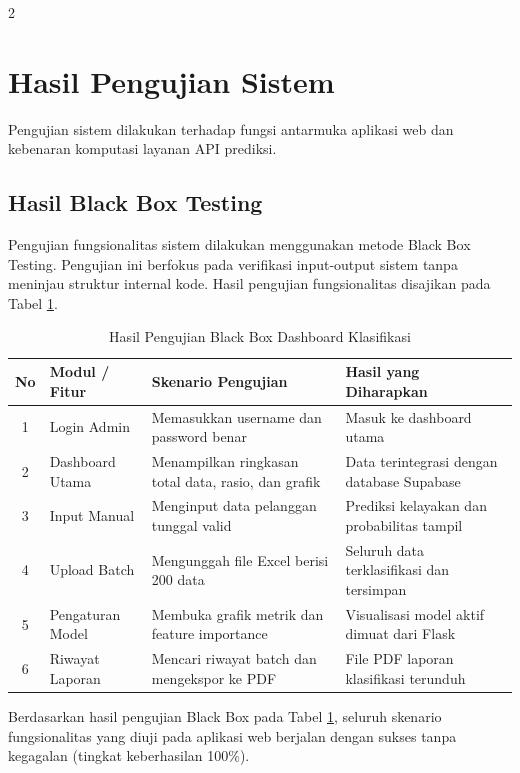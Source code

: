 \documentclass[12pt, a4paper, onecolumn, oneside]{report}
\begin{document}
\begin{spacing}{2}
\section{Hasil Pengujian Sistem}
Pengujian sistem dilakukan terhadap fungsi antarmuka aplikasi web dan kebenaran komputasi layanan API prediksi.

\subsection{Hasil Black Box Testing}
Pengujian fungsionalitas sistem dilakukan menggunakan metode Black Box Testing. Pengujian ini berfokus pada verifikasi input-output sistem tanpa meninjau struktur internal kode. Hasil pengujian fungsionalitas disajikan pada Tabel \ref{tab:blackbox_testing_results}.

\begin{table}[H]
\centering
\caption{Hasil Pengujian Black Box Dashboard Klasifikasi}
\label{tab:blackbox_testing_results}
\begin{tabularx}{\textwidth}{|c|p{3.5cm}|p{5.5cm}|X|}
\hline
\textbf{No} & \textbf{Modul / Fitur} & \textbf{Skenario Pengujian} & \textbf{Hasil yang Diharapkan} \\ \hline
1 & Login Admin & Memasukkan username dan password benar & Masuk ke dashboard utama \\ \hline
2 & Dashboard Utama & Menampilkan ringkasan total data, rasio, dan grafik & Data terintegrasi dengan database Supabase \\ \hline
3 & Input Manual & Menginput data pelanggan tunggal valid & Prediksi kelayakan dan probabilitas tampil \\ \hline
4 & Upload Batch & Mengunggah file Excel berisi 200 data & Seluruh data terklasifikasi dan tersimpan \\ \hline
5 & Pengaturan Model & Membuka grafik metrik dan feature importance & Visualisasi model aktif dimuat dari Flask \\ \hline
6 & Riwayat Laporan & Mencari riwayat batch dan mengekspor ke PDF & File PDF laporan klasifikasi terunduh \\ \hline
\end{tabularx}
\end{table}

Berdasarkan hasil pengujian Black Box pada Tabel \ref{tab:blackbox_testing_results}, seluruh skenario fungsionalitas yang diuji pada aplikasi web berjalan dengan sukses tanpa kegagalan (tingkat keberhasilan 100\%).


\end{spacing}
\end{document}
